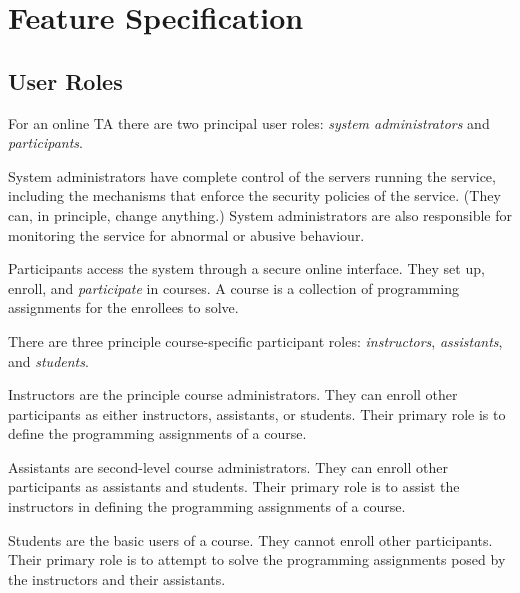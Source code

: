 
\chapter{Feature Specification}



\section{User Roles}


For an online TA there are two principal user roles: \emph{system
administrators} and \emph{participants}.

System administrators have complete control of the servers running the service,
including the mechanisms that enforce the security policies of the service.
(They can, in principle, change anything.) System administrators are also
responsible for monitoring the service for abnormal or abusive behaviour.


Participants access the system through a secure online interface. They set up,
enroll, and \emph{participate} in courses. A course is a collection of
programming assignments for the enrollees to solve.

There are three principle course-specific participant roles:
\emph{instructors}, \emph{assistants}, and \emph{students}.

Instructors are the principle course administrators. They can enroll other
participants as either instructors, assistants, or students. Their primary role
is to define the programming assignments of a course.

Assistants are second-level course administrators. They can enroll other
participants as assistants and students. Their primary role is to assist the
instructors in defining the programming assignments of a course.

Students are the basic users of a course. They cannot enroll other
participants. Their primary role is to attempt to solve the programming
assignments posed by the instructors and their assistants.


